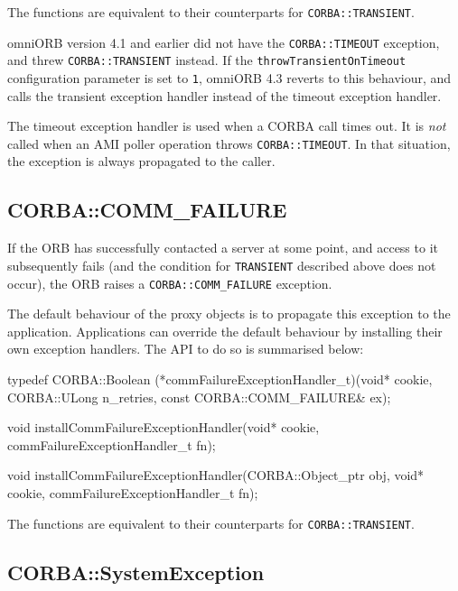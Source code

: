 \documentclass[11pt,oneside,a4paper]{book}
\newcommand{\code}[1]{\texttt{#1}}
\newcommand{\dsc}{\discretionary{}{}{}}
\begin{document}
The functions are equivalent to their counterparts for
\code{CORBA::TRANSIENT}.

omniORB version 4.1 and earlier did not have the \code{CORBA::TIMEOUT}
exception, and threw \code{CORBA::TRANSIENT} instead. If the
\code{throwTransientOnTimeout} configuration parameter is set to
\code{1}, omniORB 4.3 reverts to this behaviour, and calls the
transient exception handler instead of the timeout exception handler.

The timeout exception handler is used when a CORBA call times out. It
is \emph{not} called when an AMI poller operation throws
\code{CORBA::TIMEOUT}. In that situation, the exception is always
propagated to the caller.



\subsection{CORBA::COMM\_FAILURE}

If the ORB has successfully contacted a server at some point, and
access to it subsequently fails (and the condition for
\code{TRANSIENT} described above does not occur), the ORB raises a
\code{CORBA::COMM\_\dsc{}FAILURE} exception.

The default behaviour of the proxy objects is to propagate this
exception to the application. Applications can override the default
behaviour by installing their own exception handlers. The API to do so
is summarised below:

\begin{cxxlisting}
typedef CORBA::Boolean
(*commFailureExceptionHandler_t)(void* cookie,
                                 CORBA::ULong n_retries,
                                 const CORBA::COMM_FAILURE& ex);

void
installCommFailureExceptionHandler(void* cookie,
                                   commFailureExceptionHandler_t fn);

void
installCommFailureExceptionHandler(CORBA::Object_ptr obj,
                                   void* cookie,
                                   commFailureExceptionHandler_t fn);
\end{cxxlisting}

The functions are equivalent to their counterparts for
\code{CORBA::TRANSIENT}.


\subsection{CORBA::SystemException}
\end{document}
